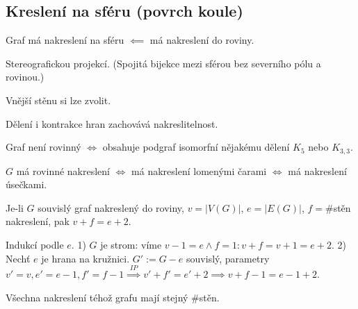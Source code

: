 \documentclass[12pt]{article}					%
\begin{document}
    \subsection{Kreslení na sféru (povrch koule)}
        \begin{veta}
            Graf má nakreslení na sféru $\impliedby$ má nakreslení do roviny.
            \begin{dukazin}
                Stereografickou projekcí. (Spojitá bijekce mezi sférou bez severního pólu a rovinou.)
            \end{dukazin}
        \end{veta}

        \begin{dusledek}
            Vnější stěnu si lze zvolit.
        \end{dusledek}

        \begin{poznamka}
            Dělení i kontrakce hran zachovává nakreslitelnost.
        \end{poznamka}

        \begin{veta}[Kuratowského]
            Graf není rovinný $\Leftrightarrow$ obsahuje podgraf isomorfní nějakému dělení $K_5$ nebo $K_{3, 3}$.
        \end{veta}

        \begin{dusledek}
            $G$ má rovinné nakreslení $\Leftrightarrow$ má nakreslení lomenými čarami $\Leftrightarrow$ má nakreslení úsečkami.
        \end{dusledek}

        \begin{veta}
            Je-li $G$ souvislý graf nakreslený do roviny, $v = |V(G)|$, $e = |E(G)|$, $f=\#$stěn nakreslení, pak $v+f = e+2$.
            \begin{dukazin}
                Indukcí podle $e$. 1) $G$ je strom: víme $v-1=e \land f=1: v+f=v+1 =e+2$. 2) Nechť $e$ je hrana na kružnici. $G' := G-e$ souvislý, parametry $v'=v, e'=e-1, f'=f-1 \overset{IP}{\implies} v'+f'=e'+2 \implies v+f-1 = e-1+2$.
            \end{dukazin}
        \end{veta}

        \begin{dusledek}
            Všechna nakreslení téhož grafu mají stejný \#stěn.
        \end{dusledek}
\end{document}
